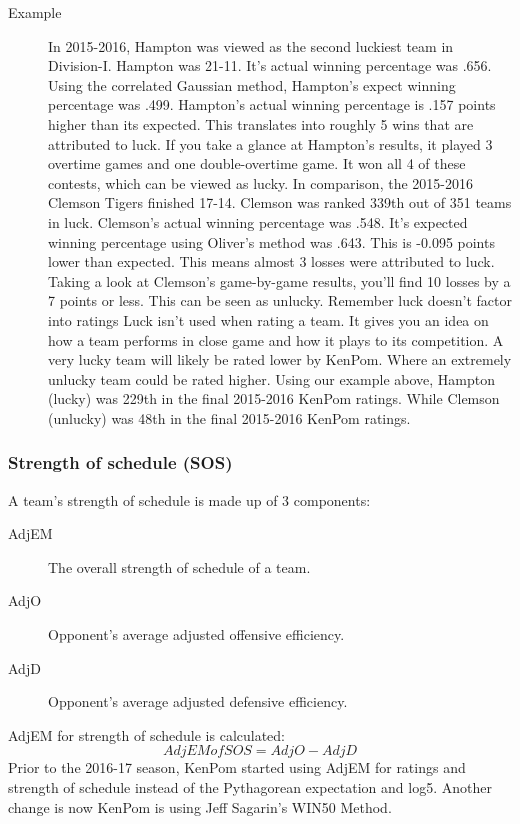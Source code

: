 \documentclass[
10pt, %
a4paper, %
oneside, %
headinclude,footinclude, %
BCOR5mm, %
]{scrartcl}
\begin{document}
\begin{description}
\item[Example]
In 2015-2016, Hampton was viewed as the second luckiest team in Division-I.
Hampton was 21-11. It's actual winning percentage was .656.
Using the correlated Gaussian method, Hampton's expect winning percentage was .499.
Hampton's actual winning percentage is .157 points higher than its expected. This translates into roughly 5 wins that are attributed to luck.
If you take a glance at Hampton's results, it played 3 overtime games and one double-overtime game. It won all 4 of these contests, which can be viewed as lucky.
In comparison, the 2015-2016 Clemson Tigers finished 17-14. Clemson was ranked 339th out of 351 teams in luck.
Clemson's actual winning percentage was .548.
It's expected winning percentage using Oliver's method was .643.
This is -0.095 points lower than expected. This means almost 3 losses were attributed to luck.
Taking a look at Clemson's game-by-game results, you'll find 10 losses by a 7 points or less. This can be seen as unlucky.
Remember luck doesn't factor into ratings
Luck isn't used when rating a team. It gives you an idea on how a team performs in close game and how it plays to its competition.
A very lucky team will likely be rated lower by KenPom.
Where an extremely unlucky team could be rated higher.
Using our example above, Hampton (lucky) was 229th in the final 2015-2016 KenPom ratings.
While Clemson (unlucky) was 48th in the final 2015-2016 KenPom ratings.\cite{luck}
\end{description}

\subsubsection{Strength of schedule (SOS)}
A team's strength of schedule is made up of 3 components:
\begin{description}
\item[AdjEM] The overall strength of schedule of a team.
\item[AdjO] Opponent's average adjusted offensive efficiency.
\item [AdjD] Opponent's average adjusted defensive efficiency.
\end{description}
AdjEM for strength of schedule is calculated:
\[AdjEM of SOS = AdjO - AdjD\]
Prior to the 2016-17 season, KenPom started using AdjEM for ratings and strength of schedule instead of the Pythagorean expectation and log5.
Another change is now KenPom is using Jeff Sagarin's WIN50 Method.
\end{document}
